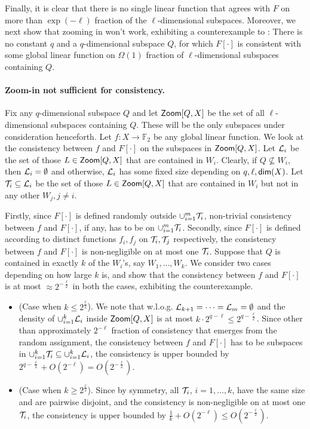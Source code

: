 \documentclass{toc}
\renewcommand\geq{\geqslant}
\renewcommand\leq{\leqslant}
\newcommand{\Zoom}{{\sf Zoom}}
\def\F{\mathbb{F}}
\begin{document}
 Finally, it is clear that there is no single linear function that
 agrees with $F$ on more than $\exp(-\ell)$ fraction of the
 $\ell$-dimensional subspaces. Moreover, we next show that zooming in
 won't work, exhibiting a counterexample to :
There is no constant $q$ and a $q$-dimensional subspace
 $Q$, for which $F[\cdot]$ is consistent with some global linear
 function on $\Omega(1)$ fraction of $\ell$-dimensional subspaces
 containing $Q$.


 \paragraph{Zoom-in not sufficient for consistency.} Fix any $q$-dimensional subspace
 $Q$ and let ${\Zoom}[Q,X]$ be the set of all $\ell$-dimensional
 subspaces containing $Q$. These will be the only subspaces under
 consideration henceforth.  Let $f:X \to \F_2$ be any global linear
 function. We look at the consistency between $f$ and $F[\cdot]$ on
 the subspaces in ${\Zoom}[Q,X]$.  Let ${\cal L}_i$ be the set of
 those $L \in {\Zoom}[Q,X]$ that are contained in $W_i$. Clearly,
 if $Q \not\subseteq W_i$, then ${\cal L}_i = \emptyset$ and
 otherwise, ${\cal L}_i$ has some fixed size depending on
 $q, \ell, {\sf dim}(X)$.  Let ${\cal T}_i \subseteq {\cal L}_i$ be
 the set of those $L \in {\Zoom}[Q,X]$ that are contained in $W_i$
 but not in any other $W_j, j \not=
 i$. %

\smallskip
Firstly, since $F[\cdot]$ is defined randomly outside $\cup_{i=1}^m {\cal T}_i$,  non-trivial consistency between $f$ and $F[\cdot]$,
if any, has to be on $\cup_{i=1}^m {\cal T}_i$. Secondly, since $F[\cdot]$ is defined according to distinct functions $f_i, f_j$ on ${\cal T}_i, {\cal T}_j$
respectively, the consistency between $f$ and $F[\cdot]$ is non-negligible on at most one ${\cal T}_i$.
Suppose that $Q$ is contained in exactly $k$ of the $W_i$'s, say $W_1,
\ldots, W_k$. We consider two cases depending on how large $k$ is, and
show that
the  consistency between $f$ and $F[\cdot]$ is at most $\approx 2^{-\frac{\ell}{2}}$ in both the cases, exhibiting the counterexample.
\begin{itemize}
\item (Case when $k \leq 2^{\frac{\ell}{2}}$).  We note that
  w.l.o.g. ${\cal L}_{k+1} = \cdots = {\cal L}_m = \emptyset$ and the
  density of $\cup_{i=1}^k {\cal L}_i$ inside ${\Zoom}[Q, X]$ is at
  most $k \cdot 2^{q-\ell} \leq 2^{q-\frac{\ell}{2}}$. Since other
  than  approximately $2^{-\ell}$ fraction of consistency that emerges
  from the random assignment, the
  consistency between $f$ and $F[\cdot]$ has to be subspaces in
  $\cup_{i=1}^k {\cal T}_i \subseteq \cup_{i=1}^k {\cal L}_i$, the
  consistency is upper bounded by $2^{q-\frac{\ell}{2}}+O(2^{-\ell})=O(2^{-\frac{\ell}{2}})$.
\item (Case when $k \geq 2^{\frac{\ell}{2}}$). Since by symmetry, all ${\cal T}_i$, $i=1,\ldots,k$,  have
the same size and are pairwise disjoint, and the consistency is non-negligible on at most one ${\cal T}_i$, the consistency is upper bounded by $\frac{1}{k}+ O(2^{-\ell})\leq O(2^{-\frac{\ell}{2}}).$
\end{itemize}
\end{document}
